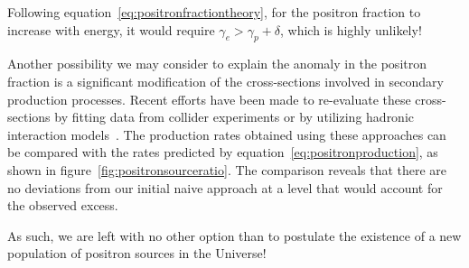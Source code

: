 Following equation~\eqref{eq:positronfractiontheory}, for the positron fraction to increase with energy, it would require $\gamma_e > \gamma_p + \delta$, which is highly unlikely!

Another possibility we may consider to explain the anomaly in the positron fraction is a significant modification of the cross-sections involved in secondary production processes.
%
Recent efforts have been made to re-evaluate these cross-sections by fitting data from collider experiments or by utilizing hadronic interaction models~\cite{Orusa2022prd,Kachelriess2019cpc}. The production rates obtained using these approaches can be compared with the rates predicted by equation~\eqref{eq:positronproduction}, as shown in figure~\ref{fig:positronsourceratio}. 
%
The comparison reveals that there are no deviations from our initial naive approach at a level that would account for the observed excess.

As such, we are left with no other option than to postulate the existence of a new population of positron sources in the Universe!
